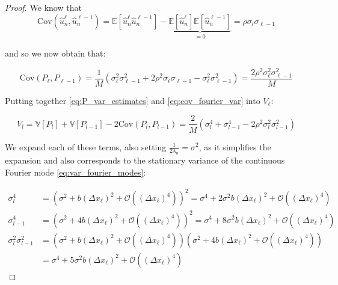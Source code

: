 \begin{proof}
    We know that 
    $$
    \mathrm{Cov}(\hat{u}_n^\ell, \hat{u}_n^{\ell-1})
    = \mathbb{E}[\hat{u}_n^\ell \hat{u}_n^{\ell-1}] - 
    \underbrace{\mathbb{E}[\hat{u}_n^\ell]\mathbb{E}[\hat{u}_n^{\ell-1}]}_{=0}
    =\rho \sigma_l \sigma_{\ell-1}
    $$

    and so we now obtain that:

    \begin{equation}\label{eq:cov_fourier_var}
        \mathrm{Cov}(P_\ell, P_{\ell-1}) = 
        \frac{1}{M}\left(\sigma_\ell^2 \sigma_{\ell-1}^2 + 
        2\rho^2\sigma_\ell \sigma_{\ell-1} - 
        \sigma_\ell^2 \sigma_{\ell-1}^2\right)
        = \frac{2\rho^2\sigma_\ell^2\sigma_{\ell-1}^2}{M}
    \end{equation}

    Putting together \eqref{eq:P_var_estimates} and 
    \eqref{eq:cov_fourier_var} into $V_\ell$:

    \begin{equation}\label{eq:nearly_there_fourier_var}
        V_l = \mathbb{V}[P_l] + \mathbb{V}[P_{l-1}] - 
        2\mathrm{Cov}(P_l, P_{l-1}) = 
        \frac{2}{M}(\sigma_l^4 + \sigma_{l-1}^4 -
        2\rho^2 \sigma_l^2 \sigma_{l-1}^2)
    \end{equation}

    We expand each of these terms, also setting 
    $\frac{1}{2\lambda_n} = \sigma^2$, as it simplifies the expansion and 
    also corresponds to the stationary variance of the
    continuous Fourier mode \eqref{eq:var_fourier_modes}:

    \begin{align*}
        \sigma_l^4 &= \left(\sigma^2 + b (\Delta x_\ell)^2 + 
        \mathcal{O}\left((\Delta x_\ell)^4\right)\right)^2 = 
        \sigma^4 + 
        2 \sigma^2 b (\Delta x_\ell)^2 + \mathcal{O}\left((\Delta x_\ell)^4\right)
        \\
        \sigma_{l-1}^4 &= \left(\sigma^2 + 4b (\Delta x_\ell)^2 + 
        \mathcal{O}\left((\Delta x_\ell)^4\right)\right)^2 =
        \sigma^4 + 8\sigma^2 b(\Delta x_\ell)^2 + 
        \mathcal{O}\left((\Delta x_\ell)^4\right)
        \\
        \sigma_l^2 \sigma_{l-1}^2 &= \left(\sigma^2+ b(\Delta x_\ell)^2 + 
        \mathcal{O}\left((\Delta x_\ell)^4\right)\right)(\sigma^2
        + 4b(\Delta x_\ell)^2 + \mathcal{O}\left((\Delta x_\ell)^4\right))\\
        &= \sigma^4 + 5\sigma^2b(\Delta x_\ell)^2 + 
        \mathcal{O}\left((\Delta x_\ell)^4\right)
    \end{align*}


\end{proof}

